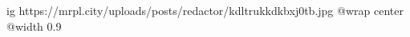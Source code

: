  
 
 
 
 

\ifcmt
  ig https://mrpl.city/uploads/posts/redactor/kdltrukkdkbxj0tb.jpg
  @wrap center
  @width 0.9
\fi

